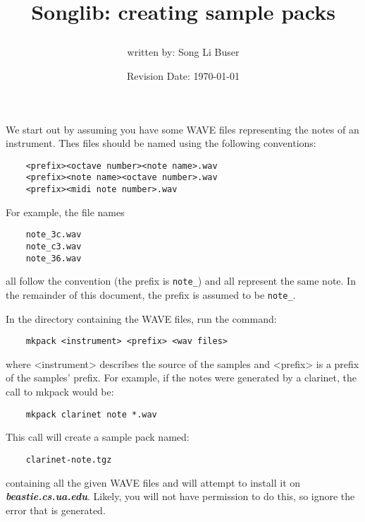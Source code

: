 \documentclass{article}
\title{Songlib: creating sample packs\\
\date{Revision Date: \today}}
\author{written by: Song Li Buser}
\begin{document}
\maketitle

\W\subsubsection*{}
\W\htmlrule

We start out by assuming you have some WAVE files
representing the notes of an instrument.
Thes files should be named using the following
conventions:

\begin{verbatim}
    <prefix><octave number><note name>.wav
    <prefix><note name><octave number>.wav
    <prefix><midi note number>.wav
\end{verbatim}

For example, the file names

\begin{verbatim}
    note_3c.wav
    note_c3.wav
    note_36.wav
\end{verbatim}

all follow the convention (the prefix is {\tt note\_})
and all represent the same note. In the remainder of this
document, the prefix is assumed to be {\tt note\_}.

In the directory containing the WAVE files, run the command:

\begin{verbatim}
    mkpack <instrument> <prefix> <wav files>
\end{verbatim}

where <instrument> describes the source of the samples and
<prefix> is a prefix of the samples' prefix. For example,
if the notes were generated by a clarinet, the call to
mkpack would be:

\begin{verbatim}
    mkpack clarinet note *.wav
\end{verbatim}

This call will create a sample pack named:

\begin{verbatim}
    clarinet-note.tgz
\end{verbatim}

containing all the given WAVE files
and will attempt to install it on \emph{\bf beastie.cs.ua.edu}. Likely,
you will not have permission to do this, so ignore the
error that is generated.
\end{document}
